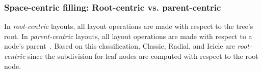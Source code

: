 \documentclass[a4paper]{llncs}
\begin{document}

 
 
\subsubsection*{Space-centric filling: Root-centric vs. parent-centric} In \textit{root-centric} layouts, all layout operations are made with respect to the tree's root. In \textit{parent-centric} layouts, all layout operations are made with respect to a node's parent~\cite{schulz2013generative}. Based on this classification, Classic, Radial, and Icicle are \textit{root-centric} since the subdivision for leaf nodes are computed with respect to the root node. %
\end{document}
